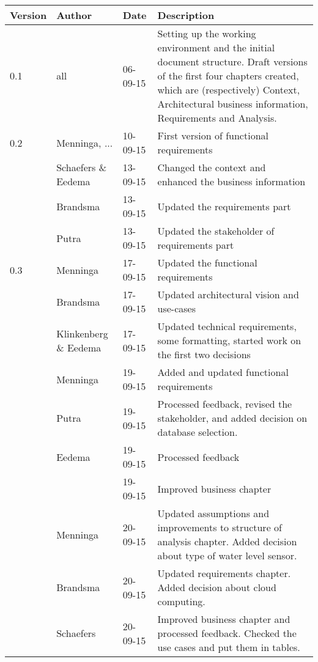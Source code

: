 \begin{longtable}{L{} L{} L{} L{}}
    \textbf{Version} & \textbf{Author} &  \textbf{Date} & \textbf{Description}\\

    \toprule
    0.1 & all & 06-09-15 & Setting up the working environment and the initial document structure. Draft versions of the first four chapters created, which are (respectively) Context, Architectural business information, Requirements and Analysis. \\
    \midrule

    0.2 & Menninga, ...     & 10-09-15 & First version of functional requirements \\
    
        & Schaefers \& Eedema   & 13-09-15 & Changed the context and enhanced the business information  \\

        & Brandsma          & 13-09-15 & Updated the requirements part \\
        & Putra            & 13-09-15 & Updated the stakeholder of requirements part \\
    \midrule

    0.3 & Menninga          & 17-09-15 & Updated the functional requirements \\
        & Brandsma          & 17-09-15 & Updated architectural vision and use-cases\\
        & Klinkenberg \& Eedema & 17-09-15 & Updated technical requirements, some formatting, started work on the first two decisions\\
        & Menninga          & 19-09-15 & Added and updated functional requirements \\
        & Putra             & 19-09-15 & Processed feedback, revised the stakeholder, and added decision on database selection.\\
        & Eedema            & 19-09-15 & Processed feedback \\
        &                   & 19-09-15 & Improved business chapter \\
        & Menninga          & 20-09-15 & Updated assumptions and improvements to structure of analysis chapter. Added decision about type of water level sensor. \\
        & Brandsma          & 20-09-15 & Updated requirements chapter. Added decision about cloud computing.\\
        & Schaefers         & 20-09-15 & Improved business chapter and processed feedback. Checked the use cases and put them in tables.\\
    \midrule


\end{longtable}
